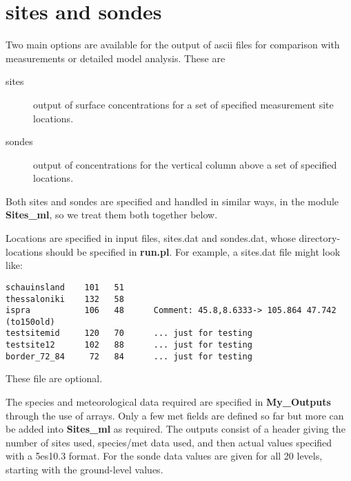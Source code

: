 \section{sites and sondes}
\label{Output:ascii}

Two main options are available for the output of ascii files for comparison
with measurements or detailed model analysis. These are

\begin{description}
\item[sites]  

      output of surface concentrations for a set of specified
      measurement site locations.
\item[sondes] 

      output of concentrations for the vertical column above
     a set of specified locations.
\end{description}

Both sites and sondes are specified and handled in similar ways, in
the module {\bf Sites\_ml}, so we treat them both together below.

Locations are specified in input files, sites.dat and sondes.dat, whose
directory-locations should be specified in {\bf run.pl}. For example,
a sites.dat file might look like:

\begin{small}\begin{verbatim}
schauinsland    101   51
thessaloniki    132   58
ispra           106   48      Comment: 45.8,8.6333-> 105.864 47.742  (to150old)
testsitemid     120   70      ... just for testing
testsite12      102   88      ... just for testing
border_72_84     72   84      ... just for testing
\end{verbatim}
\end{small}


These file are optional.

The species and meteorological data required are specified in {\bf My\_Outputs}
through the use of arrays. Only a few met fields are defined so far but
more can be added into {\bf Sites\_ml} as required. The outputs consist
of a header giving the number of sites used, species/met data used, and
then actual values specified with a 5es10.3 format. For the sonde data
values are given for all 20 levels, starting with the ground-level values.

